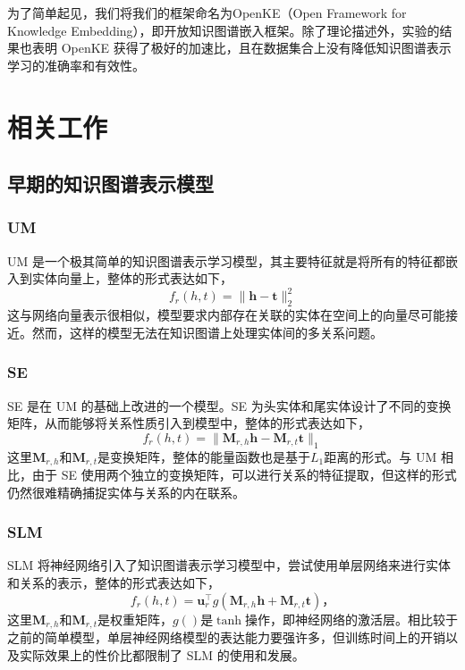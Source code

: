 为了简单起见，我们将我们的框架命名为OpenKE（Open Framework for Knowledge Embedding），即开放知识图谱嵌入框架。除了理论描述外，实验的结果也表明 OpenKE 获得了极好的加速比，且在数据集合上没有降低知识图谱表示学习的准确率和有效性。


\section{相关工作}


    \subsection{早期的知识图谱表示模型}

      \subsubsection{UM} 

      UM \cite{bordes2012joint,bordes2014semantic}是一个极其简单的知识图谱表示学习模型，其主要特征就是将所有的特征都嵌入到实体向量上，整体的形式表达如下，
      \begin{equation}
      f_r(h, t) =  \|\mathbf{h} - \mathbf{t}\|_{2}^{2}
      \end{equation}
      这与网络向量表示很相似，模型要求内部存在关联的实体在空间上的向量尽可能接近。然而，这样的模型无法在知识图谱上处理实体间的多关系问题。

      \subsubsection{SE} 

      SE \cite{bordes2011learning} 是在 UM 的基础上改进的一个模型。SE 为头实体和尾实体设计了不同的变换矩阵，从而能够将关系性质引入到模型中，整体的形式表达如下，
      \begin{equation}
      f_r(h, t) =  \| \mathbf{M}_{r, h} \mathbf{h} - \mathbf{M}_{r, t} \mathbf{t} \|_1
      \end{equation}
      这里$\mathbf{M}_{r, h}$和$\mathbf{M}_{r, t}$是变换矩阵，整体的能量函数也是基于$L_1$距离的形式。与 UM 相比，由于 SE 使用两个独立的变换矩阵，可以进行关系的特征提取，但这样的形式仍然很难精确捕捉实体与关系的内在联系。

      \subsubsection{SLM}
      SLM 将神经网络引入了知识图谱表示学习模型中，尝试使用单层网络来进行实体和关系的表示，整体的形式表达如下，
      \begin{equation}
      f_{r}(h, t) = \mathbf{u}_r^\top g (\mathbf{M}_{r, h} \mathbf{h} + \mathbf{M}_{r, t} \mathbf{t})，
      \end{equation}
      这里$\mathbf{M}_{r, h}$和$\mathbf{M}_{r, t}$是权重矩阵，$g()$是$\tanh$操作，即神经网络的激活层。相比较于之前的简单模型，单层神经网络模型的表达能力要强许多，但训练时间上的开销以及实际效果上的性价比都限制了 SLM 的使用和发展。

